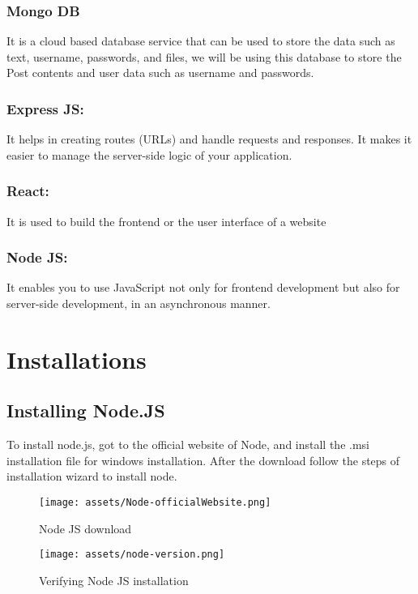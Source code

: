 \documentclass[12pt]{article}
\begin{document}
\subsubsection{\textbf{Mongo DB}}
It is a cloud based database service that can be used to store the data such as text, username, passwords, and files, we will be using this database to store the Post contents and user data such as username and passwords.

\subsubsection{Express JS:}
It helps in creating routes (URLs) and handle requests and responses. It makes it easier to manage the server-side logic of your application.

\subsubsection{React:}
It is used to build the frontend or the user interface of a website

\subsubsection{Node JS:}
It enables you to use JavaScript not only for frontend development but also for server-side development, in an asynchronous manner.



\section{Installations}

\subsection{Installing Node.JS}
To install node.js, got to the official website of Node, and install the .msi installation file for windows installation. After the download follow the steps of installation wizard to install node.

\begin{figure}[H]
    \centering
    \texttt{[image: assets/Node-officialWebsite.png]}
    \caption{Node JS download}
    \label{fig:logo}
\end{figure}

\begin{figure}[H]
    \centering
    \texttt{[image: assets/node-version.png]}
    \caption{Verifying Node JS installation}
    \label{fig:logo}
\end{figure}
\end{document}

